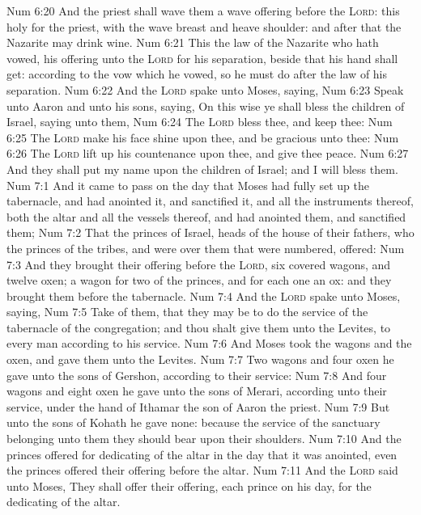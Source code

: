 \vs Num 6:20 And the priest shall wave them  a wave offering before the \textsc{Lord}: this  holy for the priest, with the wave breast and heave shoulder: and after that the Nazarite may drink wine.
\vs Num 6:21 This  the law of the Nazarite who hath vowed,  his offering unto the \textsc{Lord} for his separation, beside  that his hand shall get: according to the vow which he vowed, so he must do after the law of his separation.
\vs Num 6:22 And the \textsc{Lord} spake unto Moses, saying,
\vs Num 6:23 Speak unto Aaron and unto his sons, saying, On this wise ye shall bless the children of Israel, saying unto them,
\vs Num 6:24 The \textsc{Lord} bless thee, and keep thee:
\vs Num 6:25 The \textsc{Lord} make his face shine upon thee, and be gracious unto thee:
\vs Num 6:26 The \textsc{Lord} lift up his countenance upon thee, and give thee peace.
\vs Num 6:27 And they shall put my name upon the children of Israel; and I will bless them.
\vs Num 7:1 And it came to pass on the day that Moses had fully set up the tabernacle, and had anointed it, and sanctified it, and all the instruments thereof, both the altar and all the vessels thereof, and had anointed them, and sanctified them;
\vs Num 7:2 That the princes of Israel, heads of the house of their fathers, who  the princes of the tribes, and were over them that were numbered, offered:
\vs Num 7:3 And they brought their offering before the \textsc{Lord}, six covered wagons, and twelve oxen; a wagon for two of the princes, and for each one an ox: and they brought them before the tabernacle.
\vs Num 7:4 And the \textsc{Lord} spake unto Moses, saying,
\vs Num 7:5 Take  of them, that they may be to do the service of the tabernacle of the congregation; and thou shalt give them unto the Levites, to every man according to his service.
\vs Num 7:6 And Moses took the wagons and the oxen, and gave them unto the Levites.
\vs Num 7:7 Two wagons and four oxen he gave unto the sons of Gershon, according to their service:
\vs Num 7:8 And four wagons and eight oxen he gave unto the sons of Merari, according unto their service, under the hand of Ithamar the son of Aaron the priest.
\vs Num 7:9 But unto the sons of Kohath he gave none: because the service of the sanctuary belonging unto them  they should bear upon their shoulders.
\vs Num 7:10 And the princes offered for dedicating of the altar in the day that it was anointed, even the princes offered their offering before the altar.
\vs Num 7:11 And the \textsc{Lord} said unto Moses, They shall offer their offering, each prince on his day, for the dedicating of the altar.
